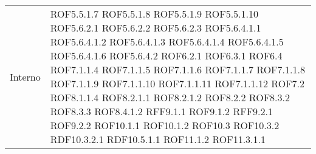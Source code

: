 \begin{center}
\begin{longtable}{| p{4cm} | p{4cm} |}
\hline
Interno & ROF5.5.1.7 \newline ROF5.5.1.8 \newline ROF5.5.1.9 \newline ROF5.5.1.10 \newline ROF5.6.2.1 \newline ROF5.6.2.2 \newline ROF5.6.2.3 \newline ROF5.6.4.1.1 \newline ROF5.6.4.1.2 \newline ROF5.6.4.1.3 \newline ROF5.6.4.1.4 \newline ROF5.6.4.1.5 \newline ROF5.6.4.1.6 \newline ROF5.6.4.2 \newline ROF6.2.1 \newline ROF6.3.1 \newline ROF6.4 \newline ROF7.1.1.4 \newline ROF7.1.1.5 \newline ROF7.1.1.6 \newline ROF7.1.1.7 \newline ROF7.1.1.8 \newline ROF7.1.1.9 \newline ROF7.1.1.10 \newline ROF7.1.1.11 \newline ROF7.1.1.12 \newline ROF7.2 \newline ROF8.1.1.4 \newline ROF8.2.1.1 \newline ROF8.2.1.2 \newline ROF8.2.2 \newline ROF8.3.2 \newline ROF8.3.3 \newline ROF8.4.1.2 \newline RFF9.1.1 \newline ROF9.1.2 \newline RFF9.2.1 \newline ROF9.2.2 \newline ROF10.1.1 \newline ROF10.1.2 \newline ROF10.3 \newline ROF10.3.2 \newline RDF10.3.2.1 \newline RDF10.5.1.1 \newline ROF11.1.2 \newline ROF11.3.1.1 \\

\end{longtable}
\end{center}
